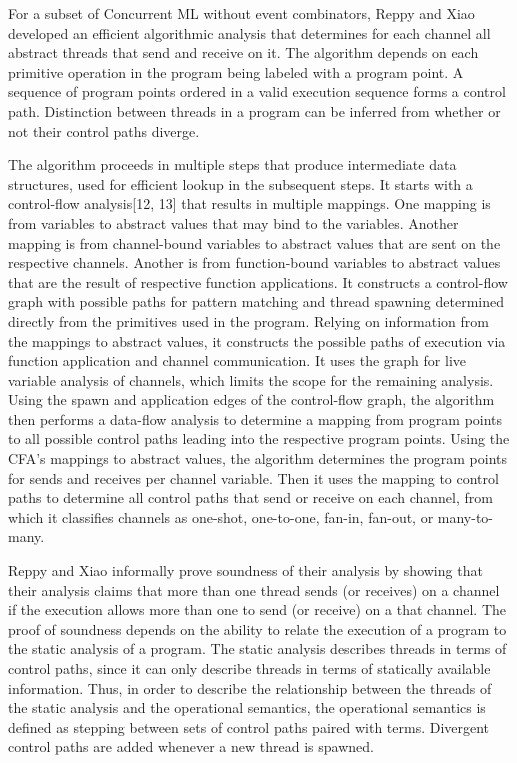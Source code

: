 \documentclass{article}
\begin{document}
For a subset of Concurrent ML without event combinators, Reppy and  Xiao developed an
efficient algorithmic analysis that determines for each channel all abstract threads that send
and receive on it.  The algorithm depends on each primitive operation in the program being
labeled with a program point.  A sequence of program points ordered in a valid execution
sequence forms a control path.  Distinction between threads in a program can be inferred from
whether or not their control paths diverge.  

The algorithm proceeds in multiple steps that produce intermediate data structures, used for
efficient lookup in the subsequent steps.  It starts with a control-flow analysis[12, 13] that
results in multiple mappings. One mapping is from variables to abstract values that may bind to
the variables.  Another mapping is from channel-bound variables to abstract values that are
sent on the respective channels.  Another is from function-bound variables to abstract values
that are the result of respective function applications.  It constructs a control-flow graph 
with possible paths for pattern matching and thread spawning determined directly from the
primitives used in the program.  Relying on information from the mappings to abstract values,
it constructs the possible paths of execution via function application and channel
communication.  It uses the graph for live variable analysis of channels, which limits the
scope for the remaining analysis.  Using the spawn and application edges of the control-flow
graph, the algorithm then performs a data-flow analysis to determine a mapping from program
points to all possible control paths leading into the respective program points.  Using the
CFA's mappings to abstract values, the algorithm determines the program points for sends and
receives per channel variable.  Then it uses the mapping to control paths to determine all
control paths that send or receive on each channel, from which it classifies channels as
one-shot, one-to-one, fan-in, fan-out, or many-to-many.

Reppy and Xiao informally prove soundness of their analysis by showing that their analysis
claims that more than one thread sends (or receives) on a channel if the execution allows more
than one to send (or receive) on a that channel.  The proof of soundness depends on the
ability to relate the execution of a program to the static analysis of a program.  The static
analysis describes threads in terms of control paths, since it can only describe threads in
terms of statically available information. Thus, in order to describe the relationship between
the threads of the static analysis and the operational semantics, the operational semantics is
defined as stepping between sets of control paths paired with terms.  Divergent control paths
are added whenever a new thread is spawned.
\end{document}

